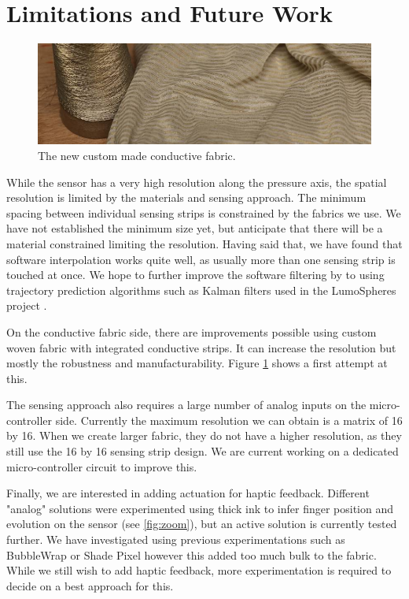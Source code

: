 \documentclass{sigchi-ext}
\begin{document}
\section{Limitations and Future Work}

\begin{figure}[!h]
    \centering
    \includegraphics[width=\columnwidth]{figures/zebra_fabric}
    \caption{The new custom made conductive fabric.}\label{fig:zebra_fabric}
\end{figure}

While the sensor has a very high resolution along the pressure axis, the spatial resolution is limited by the materials and sensing approach. The minimum spacing between individual sensing strips is constrained by the fabrics we use. We have not established the minimum size yet, but anticipate that there will be a material constrained limiting the resolution.
Having said that, we have found that software interpolation works quite well, as usually more than one sensing strip is touched at once. We hope to further improve the software filtering by to using trajectory prediction algorithms such as Kalman filters used in the LumoSpheres project \cite{lumospheres}.

On the conductive fabric side, there are improvements possible using custom woven fabric with integrated conductive strips. It can increase the resolution but mostly the robustness and manufacturability. Figure \ref{fig:zebra_fabric} shows a first attempt at this.

The sensing approach also requires a large number of analog inputs on the micro-controller side. Currently the maximum resolution we can obtain is a matrix of 16 by 16. When we create larger fabric, they do not have a higher resolution, as they still use the 16 by 16 sensing strip design. We are current working on a dedicated micro-controller circuit to improve this.

Finally, we are interested in adding actuation for haptic feedback. Different "analog" solutions were experimented using thick ink to infer finger position and evolution on the sensor (see \ref{fig:zoom}), but an active solution is currently tested further.
We have investigated using previous experimentations such as BubbleWrap \cite{bubblewrap} or Shade Pixel \cite{shadepixel} however this added too much bulk to the fabric. While we still wish to add haptic feedback, more experimentation is required to decide on a best approach for this.
\end{document}
